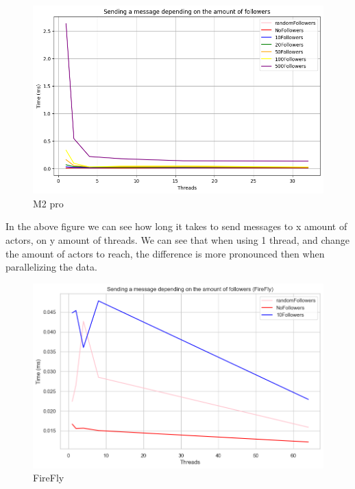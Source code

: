 \documentclass[a4paper]{article}
\begin{document}
\begin{figure}[H]
	\centering
	\includegraphics[width = \linewidth]{Images/SendingMessageLatencyMean.png}
	\caption{M2 pro}
\end{figure}
In the above figure we can see how long it takes to send messages to x amount of actors, on y amount of threads. We can see that when using 1 thread, and change the amount of actors to reach, the difference is more pronounced then when parallelizing the data.  
\begin{figure}[H]
	\centering
	\includegraphics[width = \linewidth]{Images/SendingMessageLatencyMeanFireFly.png}
	\caption{FireFly}
\end{figure}
\end{document}
